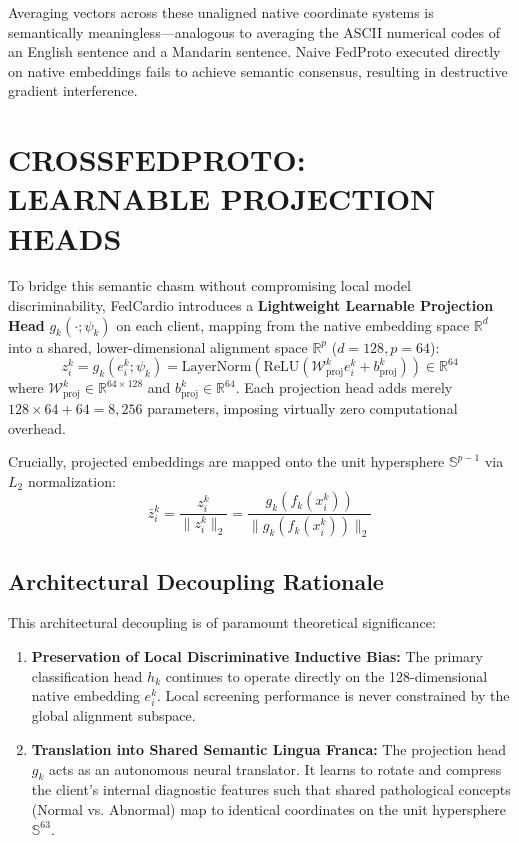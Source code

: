 \documentclass[12pt,a4paper]{amritareport}
\begin{document}
Averaging vectors across these unaligned native coordinate systems is semantically meaningless—analogous to averaging the ASCII numerical codes of an English sentence and a Mandarin sentence. Naive FedProto executed directly on native embeddings fails to achieve semantic consensus, resulting in destructive gradient interference.


\section{CROSSFEDPROTO: LEARNABLE PROJECTION HEADS}

To bridge this semantic chasm without compromising local model discriminability, FedCardio introduces a \textbf{Lightweight Learnable Projection Head} $g_k(\cdot; \psi_k)$ on each client, mapping from the native embedding space $\mathbb{R}^d$ into a shared, lower-dimensional alignment space $\mathbb{R}^p$ ($d = 128, p = 64$):
\begin{equation}
	z_i^k = g_k(e_i^k; \psi_k) = \text{LayerNorm}\left(\text{ReLU}\left(\mathcal{W}_{\text{proj}}^k e_i^k + b_{\text{proj}}^k\right)\right) \in \mathbb{R}^{64}
\end{equation}
where $\mathcal{W}_{\text{proj}}^k \in \mathbb{R}^{64 \times 128}$ and $b_{\text{proj}}^k \in \mathbb{R}^{64}$. Each projection head adds merely $128 \times 64 + 64 = 8,256$ parameters, imposing virtually zero computational overhead.

Crucially, projected embeddings are mapped onto the unit hypersphere $\mathbb{S}^{p-1}$ via $L_2$ normalization:
\begin{equation}
	\bar{z}_i^k = \frac{z_i^k}{\|z_i^k\|_2} = \frac{g_k(f_k(x_i^k))}{\|g_k(f_k(x_i^k))\|_2}
\end{equation}

\subsection{Architectural Decoupling Rationale}
This architectural decoupling is of paramount theoretical significance:
\begin{enumerate}
	\item \textbf{Preservation of Local Discriminative Inductive Bias:} The primary classification head $h_k$ continues to operate directly on the 128-dimensional native embedding $e_i^k$. Local screening performance is never constrained by the global alignment subspace.
	\item \textbf{Translation into Shared Semantic Lingua Franca:} The projection head $g_k$ acts as an autonomous neural translator. It learns to rotate and compress the client's internal diagnostic features such that shared pathological concepts (Normal vs. Abnormal) map to identical coordinates on the unit hypersphere $\mathbb{S}^{63}$.
\end{enumerate}
\end{document}
